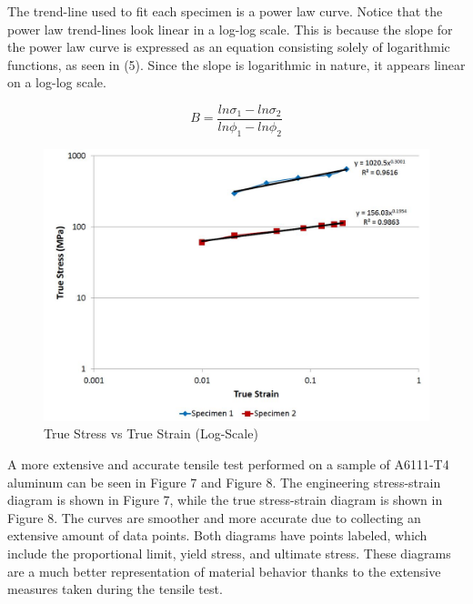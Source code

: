 \documentclass[12pt]{article}
\begin{document}
The trend-line used to fit each specimen is a power law curve. Notice that the power law trend-lines look linear in a log-log scale. This is because the slope for the power law curve is expressed as an equation consisting solely of logarithmic functions, as seen in (5). Since the slope is logarithmic in nature, it appears linear on a log-log scale. 
\bigskip

\begin{equation}
B = \frac{ln\sigma_{1}-ln\sigma_{2}}{ln\phi_{1}-ln\phi_{2}}
\end{equation}

\bigskip
\bigskip
\bigskip

\begin{figure}[h!]  
  \centering
    \includegraphics[width=\linewidth]{true_stress_vs_true_strain_log.JPG}
    \caption{True Stress vs True Strain (Log-Scale)}
\end{figure}

\newpage

A more extensive and accurate tensile test performed on a sample of A6111-T4 aluminum can be seen in Figure 7 and Figure 8. The engineering stress-strain diagram is shown in Figure 7, while the true stress-strain diagram is shown in Figure 8. The curves are smoother and more accurate due to collecting an extensive amount of data points. Both diagrams have points labeled, which include the proportional limit, yield stress, and ultimate stress. These diagrams are a much better representation of material behavior thanks to the extensive measures taken during the tensile test.

\bigskip
\end{document}
